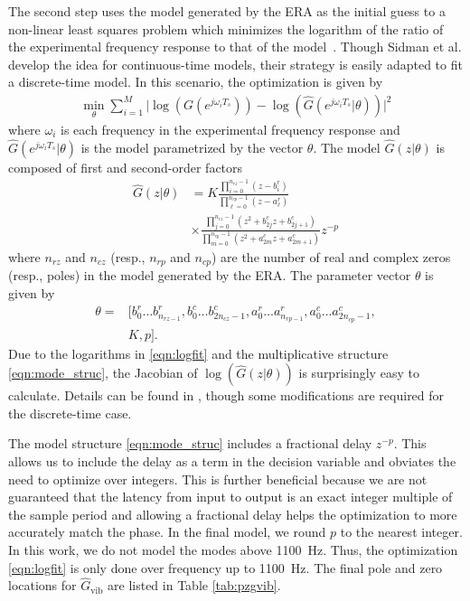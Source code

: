 \documentclass[twocolumn,twoside]{IEEEtran}
\newcommand{\hGv}{\ensuremath{\hat{G}_{\text{vib}}}\xspace}
\begin{document}
The second step uses the model generated by the ERA as the initial guess to a non-linear least squares problem which minimizes the logarithm of the ratio of the experimental frequency response to that of the model~\cite{sidman_parametric_1991}. Though Sidman et al. develop the idea for continuous-time models, their strategy is easily adapted to fit a discrete-time model. In this scenario, the optimization is given by
\begin{align}
\min_{\theta} \sum_{i=1}^M\bigl| \log(G(e^{j\omega_iT_s})) - \log(\hat{G}(e^{j\omega_iT_s}|\theta))\bigr|^2
\label{eqn:logfit}
\end{align}
where $\omega_i$ is each frequency in the experimental frequency response and $\hat{G}(e^{j\omega_iT_s}|\theta)$ is the model parametrized by the vector $\theta$. The model $\hat{G}(z|\theta)$ is composed of first and second-order factors
\begin{align}
  \hat{G}(z|\theta) &=K \frac{\prod_{i=0}^{n_{rz}-1} (z-b^r_i)}{\prod_{\ell=0}^{n_{rp}-1}(z-a^r_\ell) } \nonumber\\ 
  &\times\frac{\prod_{j=0}^{n_{cz}-1}(z^2 +b^c_{2j}z + b^c_{2j+1})}{ \prod_{m=0}^{n_{cp}-1}(z^2 +a^c_{2m}z + a^c_{2m+1})}z^{-p} \label{eqn:mode_struc}
\end{align}
where $n_{rz}$ and $n_{cz}$ (resp., $n_{rp}$ and $n_{cp}$) are the number of real and complex zeros (resp., poles) in the model generated by the ERA. The parameter vector $\theta$ is given by 
\begin{align*}
  \theta =&[b^r_0\dots b^r_{n_{rz-1}}, b^c_{0}\dots b^c_{2n_{cz}-1}, a^r_0\dots a^r_{n_{rp-1}},a^c_{0}\dots a^c_{2n_{cp}-1},\\
  & K, p].\nonumber
\end{align*}
Due to the logarithms in \eqref{eqn:logfit} and the multiplicative structure \eqref{eqn:mode_struc}, the Jacobian of $\log(\hat{G}(z|\theta))$ is surprisingly easy to calculate. Details can be found in \cite{sidman_parametric_1991}, though some modifications are required for the discrete-time case. 

The model structure \eqref{eqn:mode_struc} includes a fractional delay $z^{-p}$. This allows us to include the delay as a term in the decision variable and obviates the need to optimize over integers. This is further beneficial because we are not guaranteed that the latency from input to output is an exact integer multiple of the sample period and allowing a fractional delay helps the optimization to more accurately match the phase. In the final model, we round $p$ to the nearest integer. In this work, we do not model the modes above 1100~Hz. Thus, the optimization \eqref{eqn:logfit} is only done over frequency up to 1100~Hz. The final pole and zero locations for $\hGv$ are listed in Table \ref{tab:pzgvib}.
\end{document}
